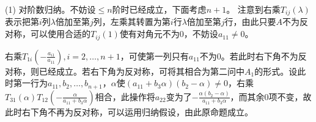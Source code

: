 \documentclass[a4paper,UTF8,fontset=windows]{ctexart}
\begin{document}
\begin{enumerate}
(1) 对阶数归纳。不妨设$\le n$阶时已经成立，下面考虑$n+1$。
注意到右乘$T_{ij}(\lambda)$表示把第$i$列$\lambda$倍加至第$j$列，左乘其转置为第$i$行$\lambda$倍加至第$j$行，由此只要$A$不为反对称，可以使用合适的$T_{ij}(1)$使有对角元不为0，不妨设$a_{11}\ne0$。

右乘$T_{1i}\left(-\frac{a_{i1}}{a_{11}}\right),i=2,\ldots,n+1$，可使第一列只有$a_{11}$不为0。若此时右下角不为反对称，则已经成立。若右下角为反对称，可将其相合为第二问中$A_1$的形式。设此时第一行为$a_{11},b_2,\ldots,b_{n+1}$，$\alpha$使$(a_{11}+b_3\alpha)(b_2-\alpha)\ne0$，右乘$T_{31}(\alpha)T_{12}\left(-\frac{\alpha}{a_{11}+b_3\alpha}\right)$相合，此操作将$a_{22}$变为了$-\frac{\alpha(b_2-\alpha)}{a_{11}+b_3\alpha}$，而其余0项不变，故此时右下角不再为反对称，可以运用归纳假设，由此原命题成立。
\end{enumerate}
\end{document}
